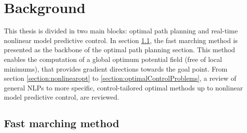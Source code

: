 
\chapter{Background}
\label{chapter:background}

This thesis is divided in two main blocks: optimal path planning and real-time nonlinear model predictive control. In section \ref{section:fastMarching}, the fast marching method is presented as the backbone of the optimal path planning section. This method enables the computation of a global optimum potential field (free of local minimums), that provides gradient directions towards the goal point. From section \ref{section:nonlinearopt} to \ref{section:optimalControlProblems}, a review of general NLPs to more specific, control-tailored optimal methods up to nonlinear model predictive control, are reviewed. 

\section{Fast marching method}
\label{section:fastMarching}

